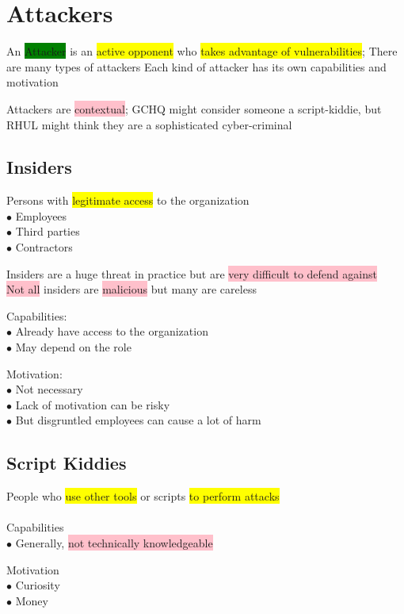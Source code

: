 \documentclass[tikz,border=10pt]{project_plan}
\newcommand{\bulletPoint}{\hspace{-3.1pt}$\bullet$ \hspace{5pt}}
\begin{document}
\section{Attackers}
An \colorbox{green}{Attacker} is an \colorbox{yellow}{active opponent} who \colorbox{yellow}{takes advantage of vulnerabilities}; There are many types of attackers
Each kind of attacker has its own capabilities and motivation

Attackers are \colorbox{pink}{contextual}; GCHQ might consider someone a script-kiddie, but RHUL might think they are
a sophisticated cyber-criminal

\subsection{Insiders}
Persons with \colorbox{yellow}{legitimate access} to the organization\\
\bulletPoint Employees\\
\bulletPoint Third parties\\
\bulletPoint Contractors

Insiders are a huge threat in practice but are \colorbox{pink}{very difficult to defend against}\\
\colorbox{pink}{Not all} insiders are \colorbox{pink}{malicious} but many are careless

Capabilities:\\
\bulletPoint Already have access to the organization\\
\bulletPoint May depend on the role

Motivation:\\
\bulletPoint Not necessary\\
\bulletPoint Lack of motivation can be risky\\
\bulletPoint But disgruntled employees can cause a lot of harm

\subsection{Script Kiddies}

People who \colorbox{yellow}{use other tools} or scripts \colorbox{yellow}{to perform attacks}\\\\
Capabilities\\
\bulletPoint Generally, \colorbox{pink}{not technically knowledgeable}

Motivation\\
\bulletPoint Curiosity\\
\bulletPoint Money
\end{document}
